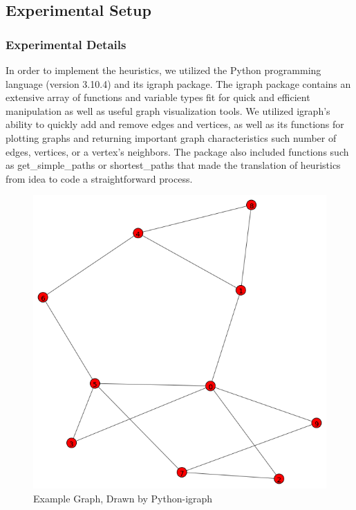 \documentclass[twocolumn,showpacs,%
  nofootinbib,aps,superscriptaddress,%
  eqsecnum,prd,notitlepage,showkeys,11pt]{article}
\begin{document}
\subsection{Experimental Setup}

\subsubsection{Experimental Details}
In order to implement the heuristics, we utilized the Python programming language (version 3.10.4) and its igraph package. The igraph package contains an extensive array of functions and variable types fit for quick and efficient manipulation as well as useful graph visualization tools. We utilized igraph's ability to quickly add and remove edges and vertices, as well as its functions for plotting graphs and returning important graph characteristics such number of edges, vertices, or a vertex's neighbors. The package also included functions such as get\_simple\_paths or shortest\_paths that made the translation of heuristics from idea to code a straightforward process.

\begin{figure}
    \centering
    \includegraphics[width=\linewidth]{examplegraph.png}
    \caption{Example Graph, Drawn by Python-igraph}
    \label{fig:ExampleGraph}
\end{figure}
\end{document}

